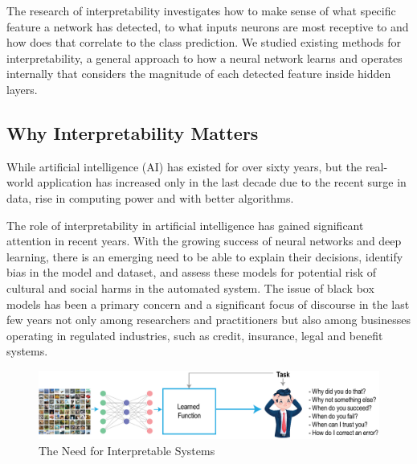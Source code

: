 The research of interpretability investigates how to make sense of what specific feature a network has detected, to what inputs neurons are most receptive to and how does that correlate to the class prediction. We studied existing methods for interpretability, a general approach to how a neural network learns and operates internally that considers the magnitude of each detected feature inside hidden layers.

\subsection{Why Interpretability Matters}

While artificial intelligence (AI) has existed for over sixty years, but the real-world application has increased only in the last decade due to the recent surge in data, rise in computing power and with better algorithms.

The role of interpretability in artificial intelligence has gained significant attention in recent years. With the growing success of neural networks and deep learning, there is an emerging need to be able to explain their decisions, identify bias in the model and dataset, and assess these models for potential risk of cultural and social harms in the automated system. The issue of black box models has been a primary concern and a significant focus of discourse in the last few years not only among researchers and practitioners \cite{Samek} but also among businesses operating in regulated industries, such as credit, insurance, legal and benefit systems.

\begin{figure}[htbp]
\centering
\includegraphics[width=1\textwidth]{images/xa-concept-part-1.eps}
\caption{The Need for Interpretable Systems \protect\footnotemark}
\label{fig:The Need for Interpretable Systems}
\end{figure}

